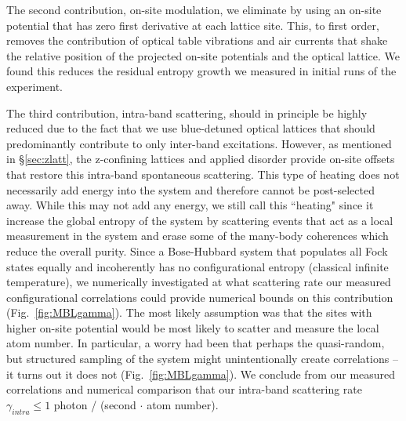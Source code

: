 The second contribution, on-site modulation, we eliminate by using an on-site potential that has zero first derivative at each lattice site. This, to first order, removes the contribution of optical table vibrations and air currents that shake the relative position of the projected on-site potentials and the optical lattice. We found this reduces the residual entropy growth we measured in initial runs of the experiment.

The third contribution, intra-band scattering, should in principle be highly reduced due to the fact that we use blue-detuned optical lattices that should predominantly contribute to only inter-band excitations\cite{Pichler2010}. However, as mentioned in \S \ref{sec:zlatt}, the z-confining lattices and applied disorder provide on-site offsets that restore this intra-band spontaneous scattering. This type of heating does not necessarily add energy into the system and therefore cannot be post-selected away. While this may not add any energy, we still call this ``heating" since it increase the global entropy of the system by scattering events that act as a local measurement in the system and erase some of the many-body coherences which reduce the overall purity. Since a Bose-Hubbard system that populates all Fock states equally and incoherently has no configurational entropy (classical infinite temperature), we numerically investigated at what scattering rate our measured configurational correlations could provide numerical bounds on this contribution (Fig.~\ref{fig:MBLgamma}). The most likely assumption was that the sites with higher on-site potential would be most likely to scatter and measure the local atom number. In particular, a worry had been that perhaps the quasi-random, but structured sampling of the system might unintentionally create correlations -- it turns out it does not (Fig.~\ref{fig:MBLgamma}). We conclude from our measured correlations and numerical comparison that our intra-band scattering rate $\gamma_{intra} \leq 1$ photon / (second $\cdot$ atom number).

